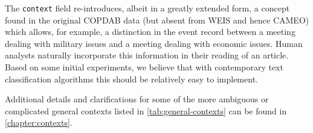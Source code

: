 \documentclass[11pt]{report}
\newcommand{\txt}[1]{\texttt{#1}}
\begin{document}
The \txt{context} field re-introduces, albeit in a greatly extended form, a concept found in the original COPDAB data (but absent from WEIS and hence CAMEO) which allows, for example, a distinction in the event record between a meeting dealing with military issues and a meeting dealing with economic issues. Human analysts naturally incorporate this information in their reading of an article. Based on some initial experiments, we believe that with contemporary text classification algorithms this should be relatively easy to implement.

Additional details and clarifications for some of the more ambiguous or complicated general contexts listed in \autoref{tab:general-contexts} can be found in \autoref{chapter:contexts}.

\end{document}
